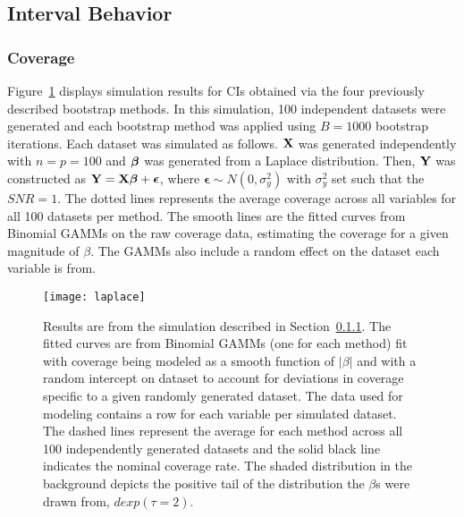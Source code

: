 \subsection{Interval Behavior}


\subsubsection{Coverage}\label{Sec:Coverage}

Figure~\ref{Fig:laplace} displays simulation results for CIs obtained via the four previously described bootstrap methods. In this simulation, 100 independent datasets were generated and each bootstrap method was applied using $B = 1000$ bootstrap iterations. Each dataset was simulated as follows. $\mathbf{X}$ was generated independently with $n = p = 100$ and $\boldsymbol{\beta}$ was generated from a Laplace distribution. Then, $\mathbf{Y}$ was constructed as $\mathbf{Y} = \mathbf{X}\boldsymbol{\beta} + \boldsymbol{\epsilon}$, where $\boldsymbol{\epsilon} \sim N(0, \sigma^2_y)$ with $\sigma^2_y$ set such that the $SNR = 1$. The dotted lines represents the average coverage across all variables for all 100 datasets per method. The smooth lines are the fitted curves from Binomial GAMMs on the raw coverage data, estimating the coverage for a given magnitude of $\beta$. The GAMMs also include a random effect on the dataset each variable is from.

\begin{figure}
  \texttt{[image: laplace]}
  \caption{\label{Fig:laplace} Results are from the simulation described in Section~\ref{Sec:Coverage}. The fitted curves are from Binomial GAMMs (one for each method) fit with coverage being modeled as a smooth function of $|\beta|$ and with a random intercept on dataset to account for deviations in coverage specific to a given randomly generated dataset. The data used for modeling contains a row for each variable per simulated dataset. The dashed lines represent the average for each method across all 100 independently generated datasets and the solid black line indicates the nominal coverage rate. The shaded distribution in the background depicts the positive tail of the distribution the $\beta$s were drawn from, $dexp(\tau = 2)$.}
\end{figure}

